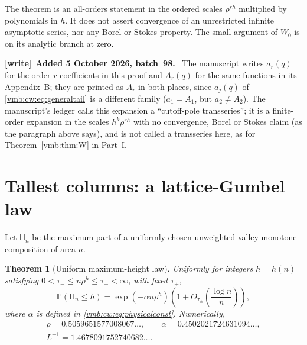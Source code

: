 \documentclass[11pt,a4paper]{article}
\numberwithin{equation}{section}
\newtheorem{theorem}{Theorem}[section]
\theoremstyle{definition}\newtheorem{definition}[theorem]{Definition}
\theoremstyle{remark}\newtheorem{remark}[theorem]{Remark}
\newcommand{\Prob}{\mathbb P}
\newenvironment{writenote}[1][]{\par\smallskip\begingroup\small
 \noindent\textbf{[write]}\if\relax\detokenize{#1}\relax\else~\textbf{#1.}\fi\ }%
 {\par\endgroup\smallskip}
\begin{document}
The theorem is an all-orders statement in the ordered scales
$\rho^{rh}$ multiplied by polynomials in $h$. It does not assert convergence
of an unrestricted infinite asymptotic series, nor any Borel or Stokes
property. The small argument of $W_0$ is on its analytic branch at zero.

\begin{writenote}[Added 5 October 2026, batch~98]
The manuscript writes $a_r(q)$ for the order-$r$ coefficients in this proof
and $A_r(q)$ for the same functions in its Appendix~B; they are printed as
$A_r$ in both places, since $a_j(q)$ of \eqref{vmb:cw:eq:generaltail} is a
different family ($a_1=A_1$, but $a_2\ne A_2$). The manuscript's ledger calls
this expansion a ``cutoff-pole transseries''; it is a finite-order expansion
in the scales $h^k\rho^{rh}$ with no convergence, Borel or Stokes claim (as
the paragraph above says), and is not called a transseries here, as for
Theorem~\ref{vmb:thm:W} in Part~I.
\end{writenote}

\section{Tallest columns: a lattice-Gumbel law}
\label{vmb:cw:sec:gumbel}
Let $\mathsf H_n$ be the maximum part of a uniformly chosen unweighted
valley-monotone composition of area $n$.

\begin{theorem}[Uniform maximum-height law]\label{vmb:cw:thm:gumbel}
Uniformly for integers $h=h(n)$ satisfying
$0<\tau_-\le n\rho^h\le\tau_+<\infty$, with fixed $\tau_\pm$,
\begin{equation}\label{vmb:cw:eq:gumbel}
 \boxed{\displaystyle
 \Prob(\mathsf H_n\le h)
 =\exp(-\alpha n\rho^h)
   \left(1+O_{\tau_\pm}\left(\frac{\log n}{n}\right)\right),}
\end{equation}
where $\alpha$ is defined in \eqref{vmb:cw:eq:physicalconst}. Numerically,
\begin{equation}\label{vmb:cw:eq:heightnumbers}
 \begin{gathered}
 \rho=0.5059651577008067\ldots,\qquad
 \alpha=0.4502021724631094\ldots,\\
 L^{-1}=1.4678091752740682\ldots.
 \end{gathered}
\end{equation}
\end{theorem}
\end{document}
